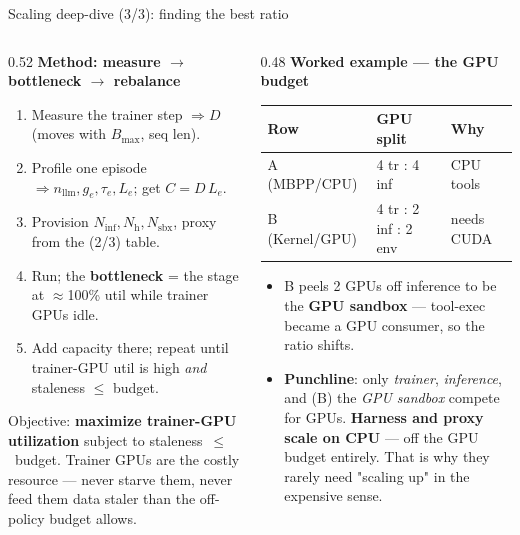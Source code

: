 \documentclass[aspectratio=169]{beamer}
\begin{document}
\begin{frame}{Scaling deep-dive (3/3): finding the best ratio}
  \begin{columns}[T]
    \begin{column}{0.52\textwidth}
      \footnotesize \textbf{Method: measure $\to$ bottleneck $\to$ rebalance}
      \begin{enumerate}\setlength\itemsep{0.15em}
        \item Measure the trainer step $\Rightarrow D$ (moves with $B_{\max}$, seq len).
        \item Profile one episode $\Rightarrow n_{\text{llm}}, g_e, \tau_e, L_e$; get $C=D\,L_e$.
        \item Provision $N_{\text{inf}}, N_{\text{h}}, N_{\text{sbx}}$, proxy from the (2/3) table.
        \item Run; the \textbf{bottleneck} = the stage at $\approx$100\% util while trainer GPUs idle.
        \item Add capacity there; repeat until trainer-GPU util is high \emph{and} staleness $\le$ budget.
      \end{enumerate}
      \vspace{0.2em}
      {\scriptsize Objective: \textbf{maximize trainer-GPU utilization} subject to
      staleness~$\le$~budget. Trainer GPUs are the costly resource --- never starve them, never feed
      them data staler than the off-policy budget allows.}
    \end{column}
    \begin{column}{0.48\textwidth}
      \footnotesize \textbf{Worked example --- the GPU budget}
      \begin{center}
      \renewcommand{\arraystretch}{1.2}\scriptsize
      \begin{tabular}{lll}
        \toprule
        \textbf{Row} & \textbf{GPU split} & \textbf{Why} \\
        \midrule
        A (MBPP/CPU)     & 4 tr : 4 inf       & CPU tools \\
        B (Kernel/GPU)   & 4 tr : 2 inf : 2 env & needs CUDA \\
        \bottomrule
      \end{tabular}
      \end{center}
      \vspace{0.2em}
      \begin{itemize}\setlength\itemsep{0.1em}
        \item B peels 2 GPUs off inference to be the \textbf{GPU sandbox} --- tool-exec became a GPU
          consumer, so the ratio shifts.
        \item \textbf{Punchline}: only \emph{trainer}, \emph{inference}, and (B) the \emph{GPU
          sandbox} compete for GPUs. \textbf{Harness and proxy scale on CPU} --- off the GPU budget
          entirely. That is why they rarely need "scaling up" in the expensive sense.
      \end{itemize}
    \end{column}
  \end{columns}
\end{frame}
\end{document}
